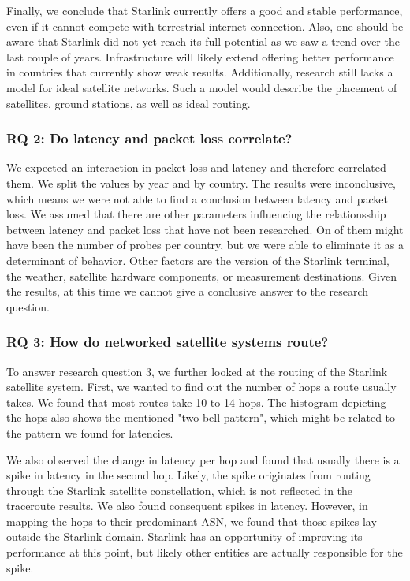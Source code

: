 Finally, we conclude that Starlink currently offers a good and stable
performance, even if it cannot compete with terrestrial internet connection.
Also, one should be aware that Starlink did not yet reach its full potential as
we saw a trend over the last couple of years. Infrastructure will likely
extend offering better performance in countries that currently show weak
results. Additionally, research still lacks a model for ideal satellite
networks. Such a model would describe the placement of satellites, ground
stations, as well as ideal routing.

\subsubsection*{RQ 2: Do latency and packet loss correlate?}

We expected an interaction in packet loss and latency and therefore correlated
them. We split the values by year and by country. The results were
inconclusive, which means we were not able to find a conclusion between latency
and packet loss. We assumed that there are other parameters influencing the
relationsship between latency and packet loss that have not been researched. On
of them might have been the number of probes per country, but we were able to
eliminate it as a determinant of behavior. Other factors are the version of the
Starlink terminal, the weather, satellite hardware components, or measurement
destinations. Given the results, at this time we cannot give a conclusive
answer to the research question.

\subsubsection*{RQ 3: How do networked satellite systems route?}

To answer research question 3, we further looked at the routing of the Starlink
satellite system. First, we wanted to find out the number of hops a route
usually takes. We found that most routes take 10 to 14 hops. The histogram
depicting the hops also shows the mentioned "two-bell-pattern", which might be
related to the pattern we found for latencies.

We also observed the change in latency per hop and found that usually there is
a spike in latency in the second hop. Likely, the spike originates from routing
through the Starlink satellite constellation, which is not reflected in the
traceroute results. We also found consequent spikes in latency. However, in
mapping the hops to their predominant \ac{ASN}, we found that those spikes lay
outside the Starlink domain. Starlink has an opportunity of improving its
performance at this point, but likely other entities are actually responsible
for the spike.

